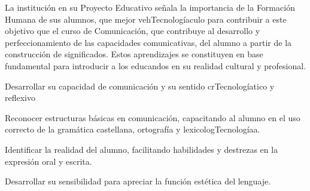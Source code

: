 \begin{syllabus}


\begin{justification}
La institución en su Proyecto Educativo señala la importancia de la Formación Humana de sus alumnos, que mejor vehTecnologíaculo para contribuir a este objetivo que el curso de Comunicación, que contribuye al desarrollo y perfeccionamiento de las capacidades comunicativas, del alumno a partir de la construcción de significados. Estos aprendizajes se constituyen en base fundamental para introducir a los educandos en su realidad cultural y profesional.
\end{justification}

\begin{goals}
\item Desarrollar su capacidad de comunicación y su sentido crTecnologíatico y reflexivo
\item Reconocer estructuras básicas en comunicación, capacitando al alumno en el uso correcto de la gramática castellana, ortografía y lexicologTecnologíaa.
\item Identificar la realidad del alumno, facilitando habilidades y destrezas en la expresión oral y escrita.
\item Desarrollar su sensibilidad para apreciar la función estética del lenguaje.
\end{goals}

\begin{outcomes}
\end{outcomes}


\end{syllabus}
